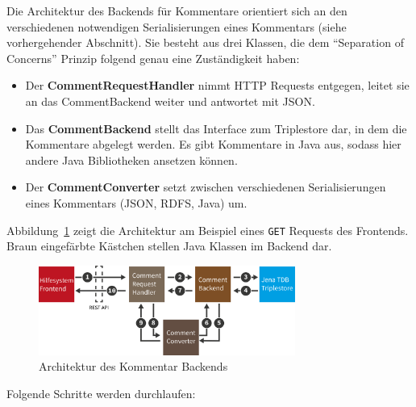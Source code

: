 \documentclass[
	headsepline,
	footsepline,
	fontsize=12pt,
	bibliography=totoc
]{scrbook}
\begin{document}
Die Architektur des Backends für Kommentare orientiert sich an den verschiedenen notwendigen Serialisierungen eines Kommentars (siehe vorhergehender Abschnitt). Sie besteht aus drei Klassen, die dem \enquote{Separation of Concerns} Prinzip folgend genau eine Zuständigkeit haben:

\begin{itemize}
	\item Der \textbf{CommentRequestHandler} nimmt HTTP Requests entgegen, leitet sie an das CommentBackend weiter und antwortet mit JSON.
	\item Das \textbf{CommentBackend} stellt das Interface zum Triplestore dar, in dem die Kommentare abgelegt werden. Es gibt Kommentare in Java aus, sodass hier andere Java Bibliotheken ansetzen können.
	\item Der \textbf{CommentConverter} setzt zwischen verschiedenen Serialisierungen eines Kommentars (JSON, RDFS, Java) um.
\end{itemize}

Abbildung~\ref{figure:kommentare-backend-architektur} zeigt die Architektur am Beispiel eines \texttt{GET} Requests des Frontends. Braun eingefärbte Kästchen stellen Java Klassen im Backend dar.

\begin{figure}[htbp]
   \centering
   \includegraphics[width=0.75\textwidth]{images/implementierung-kommentare-backend-architektur.png}
   \caption{Architektur des Kommentar Backends}
   \label{figure:kommentare-backend-architektur}
\end{figure}

Folgende Schritte werden durchlaufen:
\end{document}
